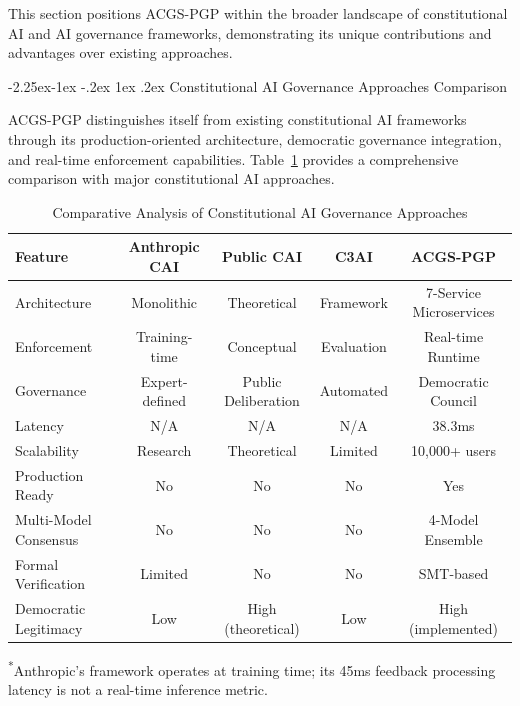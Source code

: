 \documentclass[manuscript,screen,9pt]{acmart}
\makeatletter
\renewcommand\subsection{\@startsection{subsection}{2}{\z@}%
  {-2.25ex\@plus -1ex \@minus -.2ex}%
  {1ex \@plus .2ex}%
  {\normalfont\large\bfseries}}
\newcommand{\tablesize}{\footnotesize}
\makeatother
\begin{document}
This section positions ACGS-PGP within the broader landscape of constitutional AI and AI governance frameworks, demonstrating its unique contributions and advantages over existing approaches.

\subsection{Constitutional AI Governance Approaches Comparison}

ACGS-PGP distinguishes itself from existing constitutional AI frameworks through its production-oriented architecture, democratic governance integration, and real-time enforcement capabilities. Table~\ref{tab:competitive_comparison} provides a comprehensive comparison with major constitutional AI approaches.

\begin{table}[ht]
	\centering
	\caption{Comparative Analysis of Constitutional AI Governance Approaches}
	\label{tab:competitive_comparison}
	\tablesize
	\begin{tabular}{@{}lcccc@{}}
		\toprule
		\textbf{Feature}      & \textbf{Anthropic CAI} & \textbf{Public CAI} & \textbf{C3AI} & \textbf{ACGS-PGP}       \\
		\midrule
		Architecture          & Monolithic             & Theoretical         & Framework     & 7-Service Microservices \\
		Enforcement           & Training-time          & Conceptual          & Evaluation    & Real-time Runtime       \\
		Governance            & Expert-defined         & Public Deliberation & Automated     & Democratic Council      \\
		Latency               & N/A                    & N/A                 & N/A           & 38.3ms                  \\
		Scalability           & Research               & Theoretical         & Limited       & 10,000+ users           \\
		Production Ready      & No                     & No                  & No            & Yes                     \\
		Multi-Model Consensus & No                     & No                  & No            & 4-Model Ensemble        \\
		Formal Verification   & Limited                & No                  & No            & SMT-based               \\
		Democratic Legitimacy & Low                    & High (theoretical)  & Low           & High (implemented)      \\
		\bottomrule
	\end{tabular}
	\begin{minipage}{\linewidth}\footnotesize \textsuperscript{*}Anthropic's framework operates at training time; its 45ms feedback processing latency is not a real-time inference metric.\end{minipage}
\end{table}
\end{document}
